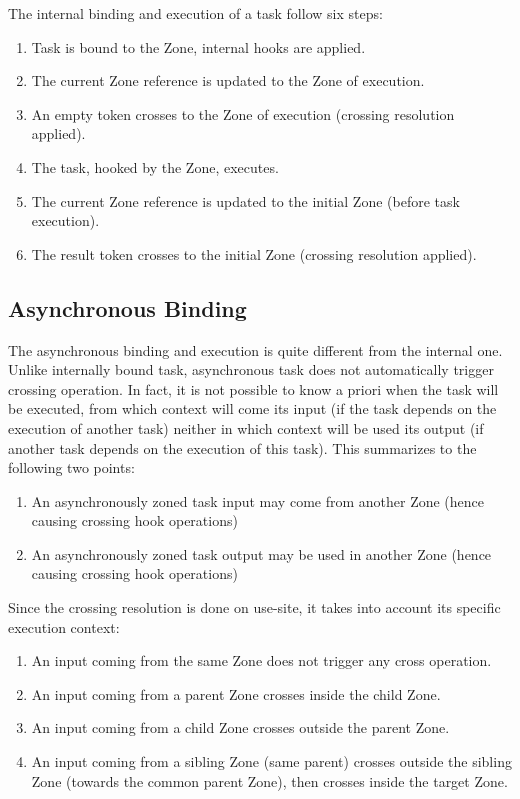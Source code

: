 The internal binding and execution of a task follow six steps:
\begin{enumerate}
\item Task is bound to the Zone, internal hooks are applied.
\item The current Zone reference is updated to the Zone of execution.
\item An empty token crosses to the Zone of execution (crossing resolution applied).
\item The task, hooked by the Zone, executes.
\item The current Zone reference is updated to the initial Zone (before task execution).
\item The result token crosses to the initial Zone (crossing resolution applied).
\end{enumerate}

\subsection*{Asynchronous Binding}

The asynchronous binding and execution is quite different from the internal one. Unlike internally bound task, asynchronous task does not automatically trigger crossing operation. In fact, it is not possible to know a priori when the task will be executed, from which context will come its input (if the task depends on the execution of another task) neither in which context will be used its output (if another task depends on the execution of this task). This summarizes to the following two points:
\begin{enumerate}
\item An asynchronously zoned task input may come from another Zone (hence causing crossing hook operations)
\item An asynchronously zoned task output may be used in another Zone (hence causing crossing hook operations)
\end{enumerate}

Since the crossing resolution is done on use-site, it takes into account its specific execution context:
\begin{enumerate}
\item An input coming from the same Zone does not trigger any cross operation.
\item An input coming from a parent Zone crosses inside the child Zone.
\item An input coming from a child Zone crosses outside the parent Zone.
\item An input coming from a sibling Zone (same parent) crosses outside the sibling Zone (towards the common parent Zone), then crosses inside the target Zone.
\end{enumerate}

